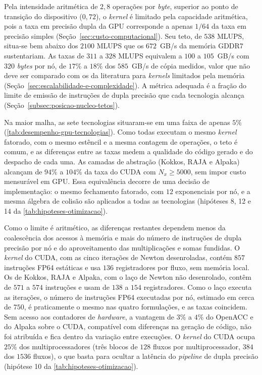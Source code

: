 Pela intensidade aritmética de \(2{,}8\) operações por \textit{byte}, superior ao ponto de transição do dispositivo (\(0{,}72\)), o \textit{kernel} é limitado pela capacidade aritmética, pois a taxa em precisão dupla da GPU corresponde a apenas \(1/64\) da taxa em precisão simples (Seção~\ref{sec:custo-computacional}).
Seu teto, de \(538\) MLUPS, situa-se bem abaixo dos \(2100\) MLUPS que os \(672\)~GB/s da memória GDDR7 sustentariam.
As taxas de \(311\) a \(328\) MLUPS equivalem a \(100\) a \(105\)~GB/s com \(320\) \textit{bytes} por nó, de \(17\%\) a \(18\%\) dos \(585\)~GB/s de cópia medidos, valor que não deve ser comparado com os da literatura para \textit{kernels} limitados pela memória (Seção~\ref{sec:escalabilidade-e-complexidade}).
A métrica adequada é a fração do limite de emissão de instruções de dupla precisão que cada tecnologia alcança (Seção~\ref{subsec:posicao-nucleo-tetos}).

Na maior malha, as sete tecnologias situaram-se em uma faixa de apenas \(5\%\) (\autoref{tab:desempenho-gpu-tecnologias}).
Como todas executam o mesmo \textit{kernel} fatorado, com o mesmo estêncil e a mesma contagem de operações, o teto é comum, e as diferenças entre as taxas medem a qualidade do código gerado e do despacho de cada uma.
As camadas de abstração (Kokkos, RAJA e Alpaka) alcançam de \(94\%\) a \(104\%\) da taxa do CUDA com \(N_x \geq 5000\), sem impor custo mensurável em GPU.
Essa equivalência decorre de uma decisão de implementação: o mesmo fechamento fatorado, com \(12\) exponenciais por nó, e a mesma álgebra de colisão são aplicados a todas as tecnologias (hipóteses 8, 12 e 14 da \autoref{tab:hipoteses-otimizacao}).

Como o limite é aritmético, as diferenças restantes dependem menos da coalescência dos acessos à memória e mais do número de instruções de dupla precisão por nó e do aproveitamento das multiplicações e somas fundidas.
O \textit{kernel} do CUDA, com as cinco iterações de Newton desenroladas, contém \(857\) instruções FP64 estáticas e usa \(136\) registradores por fluxo, sem memória local.
Os de Kokkos, RAJA e Alpaka, com o laço de Newton não desenrolado, contêm de \(571\) a \(574\) instruções e usam de \(138\) a \(154\) registradores.
Como o laço executa as iterações, o número de instruções FP64 executadas por nó, estimado em cerca de \(750\), é praticamente o mesmo nas quatro formulações, e as taxas coincidem.
Sem acesso aos contadores de \textit{hardware}, a vantagem de \(3\%\) a \(4\%\) do OpenACC e do Alpaka sobre o CUDA, compatível com diferenças na geração de código, não foi atribuída e fica dentro da variação entre execuções.
O \textit{kernel} do CUDA ocupa \(25\%\) dos multiprocessadores (três blocos de \(128\) fluxos por multiprocessador, \(384\) dos \(1536\) fluxos), o que basta para ocultar a latência do \textit{pipeline} de dupla precisão (hipótese 10 da \autoref{tab:hipoteses-otimizacao}).

